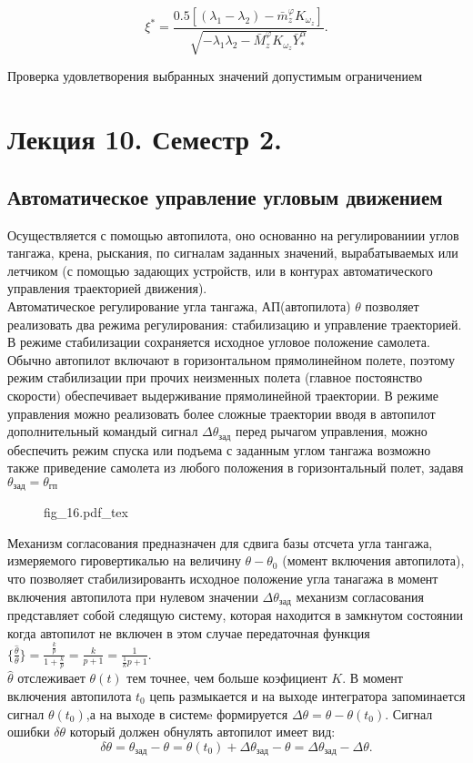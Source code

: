 \documentclass{article}
\begin{document}
\[
\xi^* = \frac{0.5[(\lambda_1 - \lambda_2) - \bar{m}_z^\varphi K_{\omega_z}]}{\sqrt{-\lambda_1\lambda_2 - \bar{M}_z^\varphi K_{\omega_z}\bar{Y}_*^\alpha }}.
\]

Проверка удовлетворения выбранных значений допустимым ограничением

\section{Лекция 10. Семестр 2.}
\subsection{Автоматическое управление угловым движением}
Осуществляется с помощью автопилота, оно основанно на регулированиии углов тангажа, крена, рыскания, по сигналам заданных значений, вырабатываемых или летчиком (с помощью задающих устройств, или в контурах автоматического управления траекторией движения).\\ 
Автоматическое регулирование угла тангажа, АП(автопилота) $\theta$ позволяет реализовать два режима регулирования: стабилизацию и управление траекторией.\\ 
В режиме стабилизации сохраняется исходное угловое положение самолета. Обычно автопилот включают в горизонтальном прямолинейном полете, поэтому режим стабилизации при прочих неизменных полета (главное постоянство скорости) обеспечивает выдерживание прямолинейной траектории. В режиме управления можно реализовать более сложные траектории вводя в автопилот дополнительный командый сигнал $\Delta \theta_{зад}$ перед рычагом управления, можно обеспечить режим спуска или подъема с заданным углом тангажа возможно также приведение самолета из любого положения в горизонтальный полет, задавя $\theta_{зад} = \theta_{гп}$ 

\begin{figure}[h]
\centering
{fig_16.pdf_tex}
\end{figure}

Механизм согласования предназначен для сдвига базы отсчета угла тангажа, измеряемого гировертикалью на величину $\theta - \theta_0$ (момент включения автопилота), что позволяет стабилизированть исходное положение угла танагажа в момент включения автопилота при нулевом значении $\Delta \theta_{зад}$ механизм согласования представляет собой следящую систему, которая находится в замкнутом состоянии когда автопилот не включен в этом случае передаточная функция $\{{\frac{\hat{\theta}}{\theta}}\}= \frac{\frac{k}{p}}{1 + \frac{k}{p}} =\frac{k}{p+1}=\frac{1}{\frac{1}{k}p + 1}$.\\
$\hat{\theta}$ отслеживает $\theta(t)$ тем точнее, чем больше коэфициент $K$. В момент включения автопилота $t_0$ цепь размыкается и на выходе интегратора запоминается сигнал $\theta(t_0)$,а на выходе в системe формируется $\Delta \theta = \theta - \theta(t_0)$. Сигнал ошибки $\delta \theta $ который должен обнулять автопилот имеет вид:
\[
\delta \theta = \theta_{зад} - \theta = \theta(t_0) + \Delta \theta_{зад} - \theta = \Delta \theta_{зад} - \Delta \theta.
\]
\end{document}
